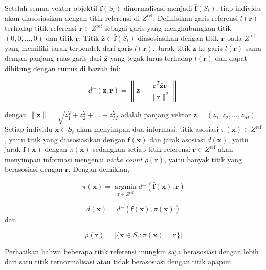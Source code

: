 Setelah semua vektor objektif $\mathbf{f}(S_t)$ dinormalisasi menjadi $\bar{\mathbf{f}}(S_t)$, tiap individu akan diasosiasikan dengan titik referensi di $Z^\text{ref}$. Definisikan garis referensi $l(\mathbf{r})$ terhadap titik referensi $\mathbf{r} \in Z^\text{ref}$ sebagai garis yang menghubungkan titik $(0,0,\dots,0)$ dan titik $\mathbf{r}$.  Titik $\bar{\mathbf{z}} \in \bar{\mathbf{f}}(S_t)$ diasosiasikan dengan titik $\mathbf{r}$ pada $Z^\text{ref}$ yang memiliki jarak terpendek dari garis $l(\mathbf{r})$. Jarak titik $\bar{\mathbf{z}}$ ke garis $l(\mathbf{r})$ sama dengan panjang ruas garis dari $\bar{\mathbf{z}}$ yang tegak lurus terhadap $l(\mathbf{r})$ dan dapat dihitung dengan rumus di bawah ini:

\begin{equation}
d^\perp(\bar{\mathbf{z}},\mathbf{r})
=
\left\|
	\bar{\mathbf{z}}-
	\frac
		{\mathbf{r}^T \bar{\mathbf{z}} \mathbf{r}}
		{\|\mathbf{r}\|^2}
\right\|
\end{equation}

dengan $\|\mathbf{z}\|=\sqrt{z_1^2+z_2^2+\dots+z_M^2}$ adalah panjang vektor $\mathbf{z}=(z_1,z_2,\dots,z_M)$
Setiap individu $\mathbf{x} \in S_t$ akan menyimpan dua informasi: titik asosiasi $\pi(\mathbf{x}) \in Z^\text{ref}$, yaitu titik yang diasosiasikan dengan $\bar{\mathbf{f}}(\mathbf{x})$ dan jarak asosiasi $d(\mathbf{x})$, yaitu jarak $\bar{\mathbf{f}}(\mathbf{x})$ dengan $\pi(\mathbf{x})$ sedangkan setiap titik referensi $\mathbf{r} \in Z^\text{ref}$ akan menyimpan informasi mengenai \textit{niche count} $\rho(\mathbf{r})$, yaitu banyak titik yang berasosiasi dengan $\mathbf{r}$. Dengan demikian,

\begin{equation}
\pi(\mathbf{x})=\underset{\mathbf{r} \in Z^\text{ref}}{\operatorname{argmin}}d^\perp(\bar{\mathbf{f}}(\mathbf{x}),\mathbf{r})
\end{equation}


\begin{equation}
d(\mathbf{x})=d^\perp(\bar{\mathbf{f}}(\mathbf{x}),\pi(\mathbf{x}))
\end{equation}
dan

\begin{equation}
\rho(\mathbf{r})=|\{\mathbf{x} \in S_t : \pi(\mathbf{x})=\mathbf{r}\}|
\end{equation}

Perhatikan bahwa beberapa titik referensi mungkin saja berasosiasi dengan lebih dari satu titik ternormalisasi atau tidak berasosiasi dengan titik apapun.
